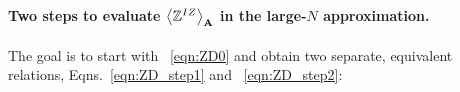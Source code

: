 
\paragraph{Two steps to evaluate $\Expected[\AMAT]{\ZD}$ in the large-$N$ approximation.}
The goal is to start with \EQN~\ref{eqn:ZD0} and obtain two separate, equivalent
relations, Eqns.~\ref{eqn:ZD_step1} and ~\ref{eqn:ZD_step2}:
